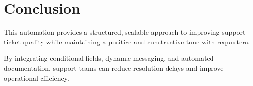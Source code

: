 \documentclass[11pt]{article}
\begin{document}
\section{Conclusion}

This automation provides a structured, scalable approach to improving support ticket quality while maintaining a positive and constructive tone with requesters.

By integrating conditional fields, dynamic messaging, and automated documentation, support teams can reduce resolution delays and improve operational efficiency.
\end{document}
